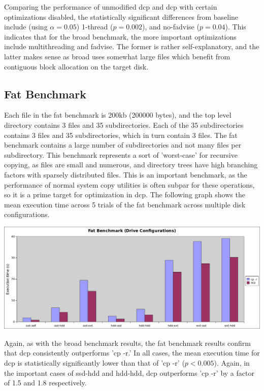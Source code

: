 \documentclass[12pt]{article}
\begin{document}
\vspace{5mm}

Comparing the performance of unmodified dcp and dcp with certain
optimizations disabled, the statistically significant differences
from baseline include (using $\alpha = 0.05$) 1-thread ($p = 0.002$),
and no-fadvise ($p = 0.04$). This indicates that for the broad benchmark,
the more important optimizations include multithreading and fadvise. The
former is rather self-explanatory, and the latter makes sense as
broad uses somewhat large files which benefit from contiguous
block allocation on the target disk. \\

\subsection{Fat Benchmark}
Each file in the fat benchmark is 200kb (200000 bytes), and
the top level directory contains 3 files and 35 subdirectories. Each
of the 35 subdirectories contains 3 files and 35 subdirectories, which in turn contain 3 files.
The fat benchmark contains a large number of subdirectories and not many files per subdirectory.
This benchmark represents a sort of 'worst-case' for recursive copying, as files are small and numerous,
and directory trees have high branching factors with sparsely distributed files. This is an important
benchmark, as the performance of normal system copy utilities is often subpar for these operations,
so it is a prime target for optimization in dcp.
The following graph shows the mean execution time across 5 trials of the fat benchmark across multiple disk configurations. \\

\vspace{5mm}

\includegraphics[width=500pt]{report/graphs/fat-manydisk.png}

\vspace{5mm}

Again, as with the broad benchmark results, the fat benchmark results confirm that
dcp consistently outperforms 'cp -r.' In all cases, the mean execution time for
dcp is statistically significantly lower than that of 'cp -r' ($p < 0.005$).
Again, in the important cases of ssd-hdd and hdd-hdd, dcp outperforms 'cp -r'
by a factor of 1.5 and 1.8 respectively. \\
\end{document}
